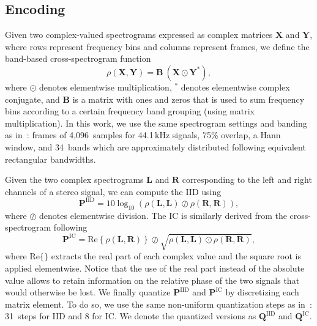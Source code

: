 \documentclass{article}
\newcommand{\dani}[1]{{\color{green}[DANI: #1]}}
\newcommand{\joan}[1]{{\color{blue}[JOAN: #1]}}
\newcommand{\dani}[1]{}
\newcommand{\joan}[1]{}
\newcommand{\ma}[1]{\textbf{#1}}
\begin{document}
\subsection{Encoding}
\label{sec:ps_encode}

Given two complex-valued spectrograms expressed as complex matrices $\ma{X}$ and $\ma{Y}$, where rows represent frequency bins and columns represent frames, we define the band-based cross-spectrogram function
\begin{equation*}
    \rho(\ma{X},\ma{Y}) = \ma{B}~(\ma{X}\odot\ma{Y}^*) ,
\end{equation*}
where $\odot$ denotes elementwise multiplication, $^*$ denotes elementwise complex conjugate, and $\ma{B}$ is a matrix with ones and zeros that is used to sum frequency bins according to a certain frequency band grouping (using matrix multiplication). In this work, we use the same spectrogram settings and banding as in~\cite{Breebaart2005}: frames of 4,096~samples for 44.1\,kHz signals, 75\% overlap, a Hann window, and 34~bands which are approximately distributed following equivalent rectangular bandwidths. 

Given the two complex spectrograms $\ma{L}$ and $\ma{R}$ corresponding to the left and right channels of a stereo signal, we can compute the IID using
\begin{equation*}
    \ma{P}^{\text{IID}} = 10\log_{10} \left( \rho(\ma{L},\ma{L}) \oslash \rho(\ma{R},\ma{R}) \right),
\end{equation*}
where $\oslash$ denotes elementwise division. The IC is similarly derived from the cross-spectrogram following
\begin{equation*}
    \ma{P}^{\text{IC}} = \text{Re}\left\{ \rho(\ma{L},\ma{R}) \right\} \oslash \sqrt{ \rho(\ma{L},\ma{L})\odot\rho(\ma{R},\ma{R}) },
\end{equation*}
where $\text{Re}\{\}$ extracts the real part of each complex value and the square root is applied elementwise. Notice that the use of the real part instead of the absolute value allows to retain information on the relative phase of the two signals that would otherwise be lost.
We finally quantize $\ma{P}^{\text{IID}}$ and $\ma{P}^{\text{IC}}$ by discretizing each matrix element. To do so, we use the same non-uniform quantization steps as in~\cite{Breebaart2005}: 31~steps for IID and 8 for IC. We denote the quantized versions as $\ma{Q}^{\text{IID}}$ and $\ma{Q}^{\text{IC}}$.
\end{document}
